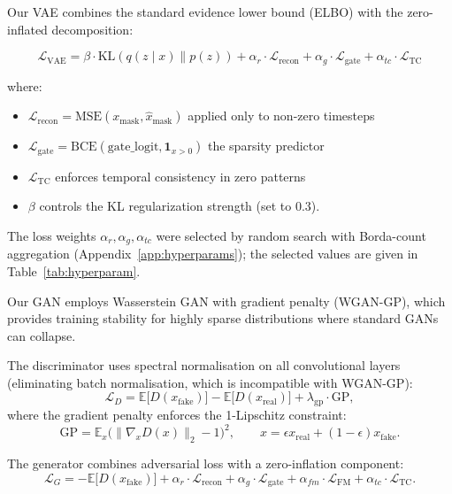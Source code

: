 \documentclass[make,article,submit,moreauthors]{Definitions/mdpi}
\begin{document}
Our VAE combines the standard evidence lower bound (ELBO) with the zero-inflated decomposition:

\begin{equation}
  \mathcal{L}_{\text{VAE}} = \beta \cdot \text{KL}(q(z \mid x) \parallel p(z)) + \alpha_r \cdot \mathcal{L}_{\text{recon}} + \alpha_g \cdot \mathcal{L}_{\text{gate}} + \alpha_{tc} \cdot \mathcal{L}_{\text{TC}}
\end{equation}

where:
\begin{itemize}
    \item $\mathcal{L}_{\text{recon}} = \text{MSE}(x_{\text{mask}}, \hat{x}_{\text{mask}})$ applied only to non-zero timesteps
    \item $\mathcal{L}_{\text{gate}} = \text{BCE}(\text{gate\_logit}, \mathbf{1}_{x>0})$ the sparsity predictor
    \item $\mathcal{L}_{\text{TC}}$ enforces temporal consistency in zero patterns
  \item $\beta$ controls the KL regularization strength (set to $0.3$).
\end{itemize}

The loss weights $\alpha_{r}, \alpha_{g}, \alpha_{tc}$ were selected by random search with Borda-count aggregation (Appendix~\ref{app:hyperparams}); the selected values are given in Table~\ref{tab:hyperparam}. 


Our GAN employs Wasserstein GAN with gradient penalty (WGAN-GP), which provides training stability for highly sparse distributions where standard GANs can collapse.

The discriminator uses spectral normalisation on all convolutional layers (eliminating batch normalisation, which is incompatible with WGAN-GP):
\begin{equation}
  \mathcal{L}_{D} = \mathbb{E}\big[D(x_{\text{fake}})\big] - \mathbb{E}\big[D(x_{\text{real}})\big] + \lambda_{\text{gp}}\cdot \mathrm{GP},
\end{equation}
where the gradient penalty enforces the 1-Lipschitz constraint:
\begin{equation}
  \mathrm{GP} = \mathbb{E}_{x}\big(\|\nabla_{x} D(x)\|_{2} - 1\big)^{2}, \qquad
  x = \epsilon x_{\text{real}} + (1-\epsilon) x_{\text{fake}}.
\end{equation}



The generator combines adversarial loss with a zero-inflation component:
\begin{equation}
  \mathcal{L}_{G} = -\mathbb{E}\big[D(x_{\text{fake}})\big]
  + \alpha_{r}\cdot \mathcal{L}_{\text{recon}}
  + \alpha_{g}\cdot \mathcal{L}_{\text{gate}}
  + \alpha_{fm}\cdot \mathcal{L}_{\text{FM}}
  + \alpha_{tc}\cdot \mathcal{L}_{\text{TC}}.
\end{equation}
\end{document}
